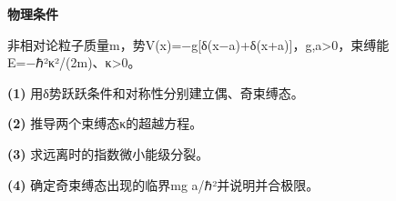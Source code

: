 \textbf{物理条件}\par 非相对论粒子质量m，势V(x)=−g[δ(x−a)+δ(x+a)]，g,a>0，束缚能E=−ℏ²κ²/(2m)、κ>0。
\par\noindent\textbf{(1)} 用δ势跃跃条件和对称性分别建立偶、奇束缚态。
\par\noindent\textbf{(2)} 推导两个束缚态κ的超越方程。
\par\noindent\textbf{(3)} 求远离时的指数微小能级分裂。
\par\noindent\textbf{(4)} 确定奇束缚态出现的临界mg a/ℏ²并说明并合极限。
